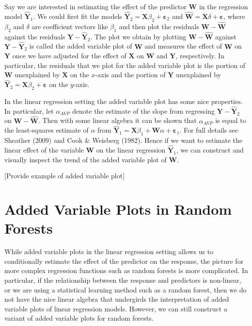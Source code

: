 \documentclass[12pt,twoside]{reedthesis}
\theoremstyle{definition}
\theoremstyle{definition}
\theoremstyle{definition}
\theoremstyle{remark}
\begin{document}
Say we are interested in estimating the effect of the predictor
\(\mathbf{W}\) in the regression model \(\hat{\mathbf{Y}}_1\). We could
first fit the models
\(\hat{\mathbf{Y}}_2=\mathbf{X}\beta_2+\mathbf{\varepsilon}_2\) and
\(\hat{\mathbf{W}}=\mathbf{X}\delta+\mathbf{\varepsilon}\), where
\(\beta_2\) and \(\delta\) are coefficient vectors like \(\beta_1\) and
then plot the residuals \(\mathbf{W}-\hat{\mathbf{W}}\) against the
residuals \(\mathbf{Y}-\hat{\mathbf{Y}}_2\). The plot we obtain by
plotting \(\mathbf{W}-\hat{\mathbf{W}}\) against
\(\mathbf{Y}-\hat{\mathbf{Y}}_2\) is called the added variable plot of
\(\mathbf{W}\) and measures the effect of \(\mathbf{W}\) on
\(\mathbf{Y}\) once we have adjusted for the effect of \(\mathbf{X}\) on
\(\mathbf{W}\) and \(\mathbf{Y}\), respectively. In particular, the
residuals that we plot for the added variable plot is the portion of
\(\mathbf{W}\) unexplained by \(\mathbf{X}\) on the \(x\)-axis and the
portion of \(\mathbf{Y}\) unexplained by
\(\hat{\mathbf{Y}}_2=\mathbf{X}\beta_2+\mathbf{\varepsilon}\) on the
\(y\)-axis.

In the linear regression setting the added variable plot has some nice
properties. In particular, let \(\alpha_{AVP}\) denote the estimate of
the slope from regressing \(\mathbf{Y}-\hat{\mathbf{Y}}_2\) on
\(\mathbf{W}-\hat{\mathbf{W}}\). Then with some linear algebra it can be
shown that \(\alpha_{AVP}\) is equal to the least-squares estimate of
\(\alpha\) from
\(\hat{\mathbf{Y}}_1=\mathbf{X}\beta_1+\mathbf{W}\alpha+\mathbf{\varepsilon}_1\).
For full details see Sheather (2009) and Cook \& Weisberg (1982). Hence
if we want to estimate the linear effect of the variable \(\mathbf{W}\)
on the linear regression \(\hat{\mathbf{Y}}_1\), we can construct and
visually inspect the trend of the added variable plot of \(\mathbf{W}\).

{[}Provide example of added variable plot{]}

\section{Added Variable Plots in Random
Forests}\label{added-variable-plots-in-random-forests}

While added variable plots in the linear regression setting allows us to
conditionally estimate the effect of the predictor on the response, the
picture for more complex regression functions such as random forests is
more complicated. In particular, if the relationship between the
response and predictors is non-linear, or we are using a statistical
learning method such as a random forest, then we do not have the nice
linear algebra that undergirds the interpretation of added variable
plots of linear regression models. However, we can still construct a
variant of added variable plots for random forests.
\end{document}
